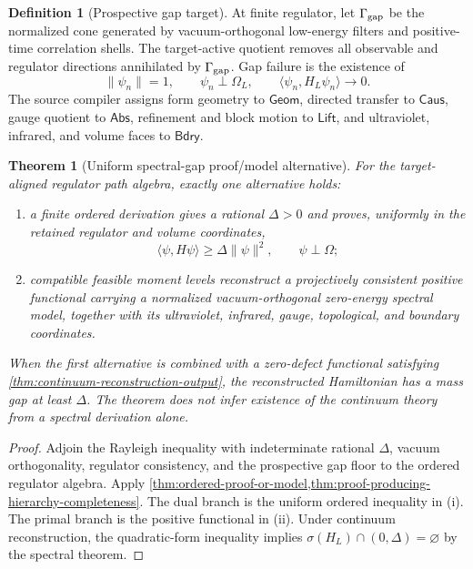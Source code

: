 \documentclass[11pt]{article}
\numberwithin{section}{part}
\theoremstyle{plain}
\newtheorem{theorem}{Theorem}[section]
\theoremstyle{definition}
\newtheorem{definition}[definition]{Definition}
\theoremstyle{remark}
\newcommand{\Geom}{\mathsf{Geom}}
\newcommand{\Caus}{\mathsf{Caus}}
\newcommand{\Abs}{\mathsf{Abs}}
\newcommand{\Lift}{\mathsf{Lift}}
\newcommand{\Bdry}{\mathsf{Bdry}}
\begin{document}
\begin{definition}[Prospective gap target]
\label{def:prospective-gap-target}
At finite regulator, let \(\Gamma_{\rm gap}\) be the normalized cone generated
by vacuum-orthogonal low-energy filters and positive-time correlation shells.
The target-active quotient removes all observable and regulator directions
annihilated by \(\Gamma_{\rm gap}\).  Gap failure is the existence of
\[
 \|\psi_n\|=1,\qquad \psi_n\perp\Omega_L,\qquad
 \langle\psi_n,H_L\psi_n\rangle\longrightarrow0.
\]
The source compiler assigns form geometry to \(\Geom\), directed transfer to
\(\Caus\), gauge quotient to \(\Abs\), refinement and block motion to
\(\Lift\), and ultraviolet, infrared, and volume faces to \(\Bdry\).
\end{definition}

\begin{theorem}[Uniform spectral-gap proof/model alternative]
\label{thm:uniform-gap-proof-model}
For the target-aligned regulator path algebra, exactly one alternative holds:
\begin{enumerate}[label=\textup{(\roman*)}]
\item a finite ordered derivation gives a rational \(\Delta>0\) and proves,
uniformly in the retained regulator and volume coordinates,
\[
 \langle\psi,H\psi\rangle\ge\Delta\|\psi\|^2,
 \qquad \psi\perp\Omega;
\]
\item compatible feasible moment levels reconstruct a projectively consistent
positive functional carrying a normalized vacuum-orthogonal zero-energy
spectral model, together with its ultraviolet, infrared, gauge, topological,
and boundary coordinates.
\end{enumerate}
When the first alternative is combined with a zero-defect functional satisfying
\cref{thm:continuum-reconstruction-output}, the reconstructed Hamiltonian has
a mass gap at least \(\Delta\).  The theorem does not infer existence of the
continuum theory from a spectral derivation alone.
\end{theorem}

\begin{proof}
Adjoin the Rayleigh inequality with indeterminate rational \(\Delta\), vacuum
orthogonality, regulator consistency, and the prospective gap floor to the
ordered regulator algebra.  Apply
\cref{thm:ordered-proof-or-model,thm:proof-producing-hierarchy-completeness}.
The dual branch is the uniform ordered inequality in \textup{(i)}.  The primal
branch is the positive functional in \textup{(ii)}.  Under continuum
reconstruction, the quadratic-form inequality implies
\(\sigma(H_L)\cap(0,\Delta)=\varnothing\) by the spectral theorem.
\end{proof}
\end{document}
